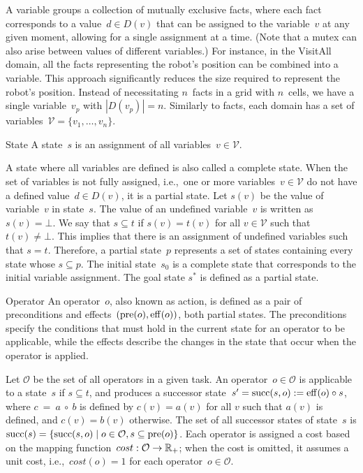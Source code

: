 A variable groups a collection of mutually exclusive facts, where each fact corresponds to a value~$d \in D(v)$ that can be assigned to the variable~$v$ at any given moment, allowing for a single assignment at a time. (Note that a mutex can also arise between values of different variables.) For instance, in the VisitAll domain, all the facts representing the robot's position can be combined into a variable. This approach significantly reduces the size required to represent the robot's position. Instead of necessitating $n$~facts in a grid with $n$~cells, we have a single variable~$v_p$ with $|D(v_p)| = n$. Similarly to facts, each domain has a set of variables~$\mathcal{V} = \{v_1,\ldots,v_n\}$.

\begin{definition}{State}
    \label{def:state}
    A state~$s$ is an assignment of all variables~$v \in \mathcal{V}$.
\end{definition}

A state where all variables are defined is also called a complete state. When the set of variables is not fully assigned, i.e.,~one or more variables~$v \in \mathcal{V}$ do not have a defined value~$d \in D(v)$, it is a partial state. Let $s(v)$ be the value of variable~$v$ in state~$s$. The value of an undefined variable~$v$ is written as~$s(v) = \bot$. We say that $s \subseteq t$ if $s(v) = t(v)$ for all $v \in \mathcal{V}$ such that $t(v) \neq \bot$. This implies that there is an assignment of undefined variables such that $s = t$. Therefore, a partial state~$p$ represents a set of states containing every state whose $s \subseteq p$. The initial state~$s_0$ is a complete state that corresponds to the initial variable assignment. The goal state $s^*$ is defined as a partial state.

\begin{definition}{Operator}
    \label{def:operator}
    An operator~$o$, also known as action, is defined as a pair of preconditions and effects~$(\operatorname{pre}(o),\operatorname{eff}(o))$, both partial states. The preconditions specify the conditions that must hold in the current state for an operator to be applicable, while the effects describe the changes in the state that occur when the operator is applied.
\end{definition}

Let $\mathcal{O}$ be the set of all operators in a given task. An operator~$o \in \mathcal{O}$ is applicable to a state~$s$ if $s \subseteq t$, and produces a successor state~$s' = \operatorname{succ}(s,o) := \operatorname{eff}(o) \circ s$, where $c~=~a~\circ~b$ is defined by $c(v) = a(v)$ for all $v$ such that $a(v)$ is defined, and $c(v)=b(v)$ otherwise. The set of all successor states of state~$s$ is $\operatorname{succ}(s) = \{\operatorname{succ}(s,o) \mid o \in \mathcal{O}, s \subseteq \operatorname{pre}(o)\}$. Each operator is assigned a cost based on the mapping function~$cost:\mathcal{O}\rightarrow\mathbb{R}_{+}$; when the cost is omitted, it assumes a unit cost, i.e.,~$cost(o) = 1$ for each operator~$o \in \mathcal{O}$.


